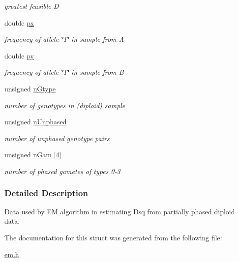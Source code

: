\begin{DoxyCompactItemize}
\begin{DoxyCompactList}\small\item\em greatest feasible D \end{DoxyCompactList}\item 
\hypertarget{struct_dsq_data_a8bae4af34213c754abcef73f595e3e4a}{double \hyperlink{struct_dsq_data_a8bae4af34213c754abcef73f595e3e4a}{px}}\label{struct_dsq_data_a8bae4af34213c754abcef73f595e3e4a}

\begin{DoxyCompactList}\small\item\em frequency of allele \char`\"{}1\char`\"{} in sample from A \end{DoxyCompactList}\item 
\hypertarget{struct_dsq_data_aa3f221eac7bb1919a62b2f8b5489c3a4}{double \hyperlink{struct_dsq_data_aa3f221eac7bb1919a62b2f8b5489c3a4}{py}}\label{struct_dsq_data_aa3f221eac7bb1919a62b2f8b5489c3a4}

\begin{DoxyCompactList}\small\item\em frequency of allele \char`\"{}1\char`\"{} in sample from B \end{DoxyCompactList}\item 
\hypertarget{struct_dsq_data_ab6f188885c3a13ac49eee9ce9fd84445}{unsigned \hyperlink{struct_dsq_data_ab6f188885c3a13ac49eee9ce9fd84445}{n\-Gtype}}\label{struct_dsq_data_ab6f188885c3a13ac49eee9ce9fd84445}

\begin{DoxyCompactList}\small\item\em number of genotypes in (diploid) sample \end{DoxyCompactList}\item 
\hypertarget{struct_dsq_data_a996906c461f0ce756ae25e72fd889be2}{unsigned \hyperlink{struct_dsq_data_a996906c461f0ce756ae25e72fd889be2}{n\-Unphased}}\label{struct_dsq_data_a996906c461f0ce756ae25e72fd889be2}

\begin{DoxyCompactList}\small\item\em number of unphased genotype pairs \end{DoxyCompactList}\item 
\hypertarget{struct_dsq_data_adcf855e9e80223d33131cb0e2b44c53e}{unsigned \hyperlink{struct_dsq_data_adcf855e9e80223d33131cb0e2b44c53e}{n\-Gam} \mbox{[}4\mbox{]}}\label{struct_dsq_data_adcf855e9e80223d33131cb0e2b44c53e}

\begin{DoxyCompactList}\small\item\em number of phased gametes of types 0-\/3 \end{DoxyCompactList}\end{DoxyCompactItemize}


\subsubsection{Detailed Description}
Data used by E\-M algorithm in estimating Dsq from partially phased diploid data. 

The documentation for this struct was generated from the following file\-:\begin{DoxyCompactItemize}
\item 
\hyperlink{em_8h}{em.\-h}\end{DoxyCompactItemize}
